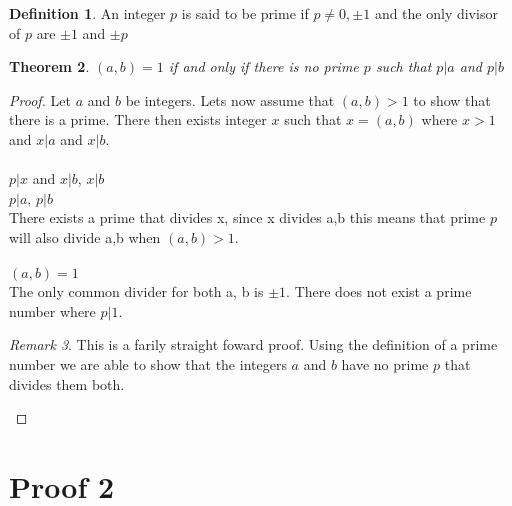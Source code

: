 \documentclass{article}
\newtheorem{thm}{Theorem}[section]
\theoremstyle{definition}
\newtheorem{definition}[thm]{Definition}
\theoremstyle{remark}
\newtheorem{remark}[thm]{Remark}
\numberwithin{equation}{section}
\begin{document}
\begin{definition}\label{def}
An integer $p$ is said to be prime if $p \neq 0, \pm 1$ and the only divisor of $p$ are $\pm 1$ and $\pm p$\\
\end{definition}
\begin{thm}
$(a,b) = 1$ if and only if there is no prime $p$ such that $p|a$ and $p|b$\\
\end{thm}
\begin{proof}
Let $a$ and $b$ be integers. Lets now assume that $(a,b) > 1$ to show that there is a prime. There then exists integer $x$ such that $x = (a,b)$ where $x > 1$ and $x|a$ and $x|b$. \\\\
$p|x$ and $x|b$, $x|b$\\
$p|a$, $p|b$\\
There exists a prime that divides x, since x divides a,b this means that prime $p$ will also divide a,b when $(a,b) > 1$.\\\\
$(a,b) = 1$\\
The only common divider for both a, b is $\pm 1$. There does not exist a prime number where $p|1$.
\\
\begin{remark}
This is a farily straight foward proof. Using the definition of a prime number we are able to show that the integers $a$ and $b$ have no prime $p$ that divides them both.
\end{remark}

\end{proof}




\section{Proof 2}
\end{document}
